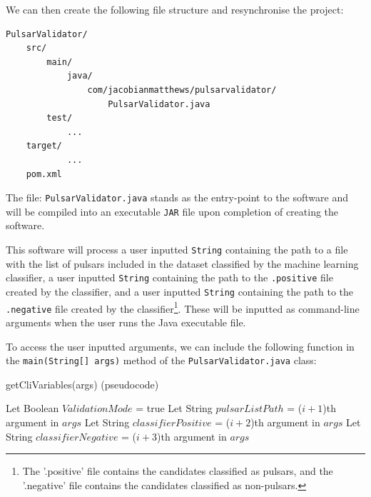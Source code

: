 \documentclass{article}
\begin{document}
\begin{appendices}
\begin{subappendices}
        We can then create the following file structure and resynchronise the project:
        
        \begin{lstlisting}[numbers=none]
PulsarValidator/
    src/
        main/
            java/
                com/jacobianmatthews/pulsarvalidator/
                    PulsarValidator.java
        test/
            ...
    target/
            ...
    pom.xml
        \end{lstlisting}
        
        The file: \verb|PulsarValidator.java| stands as the entry-point to the software and will be compiled into an executable \verb|JAR| file upon completion of creating the software.
        
        This software will process a user inputted \verb|String| containing the path to a file with the list of pulsars included in the dataset classified by the machine learning classifier, a user inputted \verb|String| containing the path to the \verb|.positive| file created by the classifier, and a user inputted \verb|String| containing the path to the \verb|.negative| file created by the classifier\footnote{The '.positive' file contains the candidates classified as pulsars, and the '.negative' file contains the candidates classified as non-pulsars.}. These will be inputted as command-line arguments when the user runs the Java executable file.
        
        To access the user inputted arguments, we can include the following function in the \verb|main(String[] args)| method of the \verb|PulsarValidator.java| class:
        
        \begin{algorithm}[H]
            \caption{getCliVariables(args) (pseudocode)}
            \begin{algorithmic}
                        \State Let Boolean $ValidationMode$ = true
                        \State Let String $pulsarListPath$ = ($i+1$)th argument in $args$
                        \State Let String $classifierPositive$ = ($i+2$)th argument in $args$
                        \State Let String $classifierNegative$ = ($i+3$)th argument in $args$
                    \EndIf
                \EndFor
            \end{algorithmic}
        \end{algorithm}
        

\end{subappendices}
\end{appendices}
\end{document}
